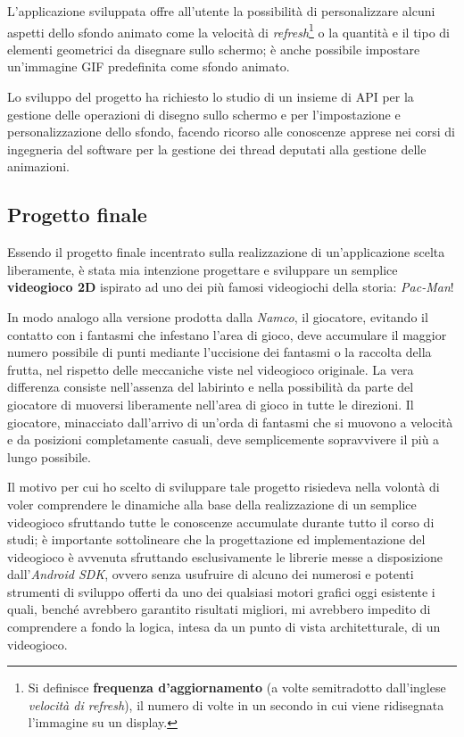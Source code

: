 \documentclass[10pt,a4paper, titlepage]{article}
\begin{document}
L'applicazione sviluppata offre all'utente la possibilità di personalizzare alcuni aspetti dello sfondo animato come la velocità di \textit{refresh}\footnote{Si definisce \textbf{frequenza d'aggiornamento} (a volte semitradotto dall'inglese \textit{velocità di refresh}), il numero di volte in un secondo in cui viene ridisegnata l'immagine su un display.} o la quantità e il tipo di elementi geometrici da disegnare sullo schermo; è anche possibile impostare un'immagine GIF predefinita come sfondo animato.

Lo sviluppo del progetto ha richiesto lo studio di un insieme di API per la gestione delle operazioni di disegno sullo schermo e per l'impostazione e personalizzazione dello sfondo, facendo ricorso alle conoscenze apprese nei corsi di ingegneria del software per la gestione dei thread deputati alla gestione delle animazioni.

\subsection{Progetto finale}

Essendo il progetto finale incentrato sulla realizzazione di un'applicazione scelta liberamente, è stata mia intenzione progettare e sviluppare un semplice \textbf{videogioco 2D} ispirato ad uno dei più famosi videogiochi della storia: \textit{Pac-Man}!

In modo analogo alla versione prodotta dalla \textit{Namco}, il giocatore, evitando il contatto con i fantasmi che infestano l'area di gioco, deve accumulare il maggior numero possibile di punti mediante l'uccisione dei fantasmi o la raccolta della frutta, nel rispetto delle meccaniche viste nel videogioco originale. La vera differenza consiste nell'assenza del labirinto e nella possibilità da parte del giocatore di muoversi liberamente nell'area di gioco in tutte le direzioni. Il giocatore, minacciato dall'arrivo di un'orda di fantasmi che si muovono a velocità e da posizioni completamente casuali, deve semplicemente sopravvivere il più a lungo possibile. 

Il motivo per cui ho scelto di sviluppare tale progetto risiedeva nella volontà di voler comprendere le dinamiche alla base della realizzazione di un semplice videogioco sfruttando tutte le conoscenze accumulate durante tutto il corso di studi; è importante sottolineare che la progettazione ed implementazione del videogioco è avvenuta sfruttando esclusivamente le librerie messe a disposizione dall'\textit{Android SDK}, ovvero senza usufruire di alcuno dei numerosi e potenti strumenti di sviluppo offerti da uno dei qualsiasi motori grafici oggi esistente i quali, benché avrebbero garantito risultati migliori, mi avrebbero impedito di comprendere a fondo la logica, intesa da un punto di vista architetturale, di un videogioco.
\end{document}
